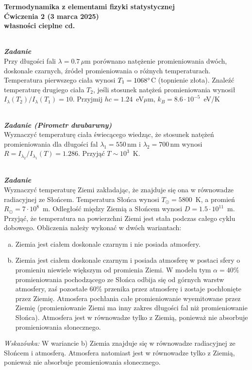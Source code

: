 \documentclass[11pt,a4paper]{article}
\newcounter{zadanie}\newcommand{\zadanie}[1][]{\addtocounter{zadanie}{1} ~\\  {\bf \emph{Zadanie \arabic{zadanie} #1 }} \\}
\begin{document}
\vspace*{-1.8cm}

\begin{centering}
\bf{\Large{Termodynamika z elementami fizyki statystycznej}}\\
Ćwiczenia 2 (3 marca 2025)\\[1mm]
własności cieplne cd. \\
\end{centering}

\zadanie
Przy długości fali $\lambda = 0.7\,\mu$m porównano natężenie promieniowania dwóch,
doskonale czarnych, źródeł promieniowania o różnych temperaturach.
Temperatura pierwszego ciała wynosi $T_1 = 1068 \degree$C (topnienie złota). 
Znaleźć temperaturę drugiego ciała $T_2$, jeśli stosunek natężeń promieniowania 
wynosił $I_\lambda (T_2)/I_\lambda (T_1) = 10$.
Przyjmij $hc = 1.24$~eV$\mu$m, $k_{B} = 8.6\cdot 10^{-5}$~eV/K

\zadanie [(Pirometr dwubarwny)]
Wyznaczyć temperaturę ciała świecącego wiedząc, że stosunek natężeń promieniowania dla długości fal
$\lambda_1=550$\,nm i $\lambda_2=700$\,nm wynosi $R=I_{\lambda_2}/I_{\lambda_1}(T)=1.286$.
Przyjąć $T \sim 10^{3}$~K.

\zadanie
Wyznaczyć temperaturę Ziemi zakładając, że znajduje się ona w równowadze radiacyjnej ze
Słońcem. Temperatura Słońca wynosi $T_\odot = 5800$~K, a promień $R_\odot = 7 \cdot 10^8$~m.
Odległość między Ziemią a Słońcem wynosi $D = 1.5 \cdot 10^{11}$~m. 
Przyjąć, że temperatura na powierzchni Ziemi jest stała podczas całego cyklu dobowego.
Obliczenia należy wykonać w dwóch wariantach:\\
\begin{enumerate}[a)]
        \item Ziemia jest ciałem doskonale czarnym i nie posiada atmosfery.
        \item Ziemia jest ciałem doskonale czarnym i posiada atmosferę w postaci sfery o promieniu niewiele większym od promienia Ziemi. 
        W modelu tym $\alpha=40\%$ promieniowania pochodzącego ze Słońca odbija się od górnych warstw atmosfery, zaś pozostałe $60\%$ 
        przenika przez atmosferę i zostaje pochłonięte przez Ziemię. Atmosfera pochłania całe promieniowanie wyemitowane przez Ziemię
  (promieniowanie Ziemi ma inny zakres długości fal niż promieniowanie Słońca). Atmosfera jest w równowadze tylko z Ziemią, 
  ponieważ nie absorbuje promieniowania słonecznego.
\end{enumerate}
{\it Wskazówka: }
W wariancie b) Ziemia znajduje się w równowadze radiacyjnej ze Słońcem i atmosferą. 
Atmosfera natomiast jest w równowadze tylko z Ziemią, ponieważ nie absorbuje promieniowania słonecznego.
\end{document}
